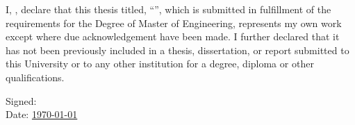 \begin{declaration}
\setcounter{page}{1}
\addchaptertocentry{\authorshipname} %

\vspace{0.6cm}
I, \authorname, declare that this thesis titled, \enquote{\ttitle}, which is submitted in fulfillment of the requirements for the Degree of Master of Engineering, represents my own work except where due acknowledgement have been made. I further declared that it has not been previously included in a thesis, dissertation, or report submitted to this University or to any other institution for a degree, diploma or other qualifications.


\vspace{2cm} 
\begin{flushright}
\hfill Signed: \underline{\hspace{5cm}}\\[2em] %
\hfill Date: \underline{\hspace{1.5cm} \usdate\today \hspace{1.5cm}}\\ %
\end{flushright}

\end{declaration}


